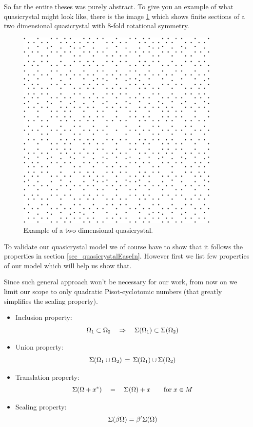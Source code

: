 \documentclass[text.tex]{subfiles}
\begin{document}
So far the entire theses was purely abstract. To give you an example of what quasicrystal might look like, there is the image \ref{fig_quasicrystalFirstExample} which shows finite sections of a two dimensional quasicrystal with $8$-fold rotational symmetry.

\begin{figure}[h]
\centering
\includegraphics[width=0.9\textwidth]{img/firstExample}
\caption{Example of a two dimensional quasicrystal.}
\label{fig_quasicrystalFirstExample}
\end{figure}

To validate our quasicrystal model we of course have to show that it follows the properties in section \ref{sec_quasicrystalEaseIn}. However first we list few properties of our model which will help us show that. 

Since such general approach won't be necessary for our work, from now on we limit our scope to only quadratic Pisot-cyclotomic numbers (that greatly simplifies the scaling property). 

\begin{itemize}
\item Inclusion property: $$\Omega_1\subset\Omega_2 \quad\Rightarrow\quad \Sigma(\Omega_1)\subset\Sigma(\Omega_2)$$
\item Union property: $$\Sigma(\Omega_1\cup\Omega_2) \,=\, \Sigma(\Omega_1)\cup\Sigma(\Omega_2)$$
\item Translation property: $$\Sigma(\Omega+x^\ast) \quad=\quad \Sigma(\Omega)+x\qquad \text{for}\; x\in M$$
\item Scaling property: $$\Sigma(\beta\Omega) = \beta'\Sigma(\Omega)$$
\end{itemize}
\end{document}
